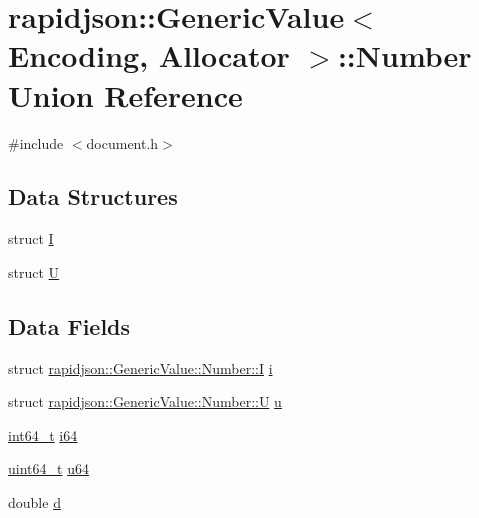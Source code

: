 \hypertarget{unionrapidjson_1_1_generic_value_1_1_number}{}\section{rapidjson\+::Generic\+Value$<$ Encoding, Allocator $>$\+::Number Union Reference}
\label{unionrapidjson_1_1_generic_value_1_1_number}


{\ttfamily \#include $<$document.\+h$>$}

\subsection*{Data Structures}
\begin{DoxyCompactItemize}
\item 
struct \mbox{\hyperlink{structrapidjson_1_1_generic_value_1_1_number_1_1_i}{I}}
\item 
struct \mbox{\hyperlink{structrapidjson_1_1_generic_value_1_1_number_1_1_u}{U}}
\end{DoxyCompactItemize}
\subsection*{Data Fields}
\begin{DoxyCompactItemize}
\item 
struct \mbox{\hyperlink{structrapidjson_1_1_generic_value_1_1_number_1_1_i}{rapidjson\+::\+Generic\+Value\+::\+Number\+::I}} \mbox{\hyperlink{unionrapidjson_1_1_generic_value_1_1_number_abf0b096b8d93d4edbb7d5f5f211b3045}{i}}
\item 
struct \mbox{\hyperlink{structrapidjson_1_1_generic_value_1_1_number_1_1_u}{rapidjson\+::\+Generic\+Value\+::\+Number\+::U}} \mbox{\hyperlink{unionrapidjson_1_1_generic_value_1_1_number_ae5996c0c17bcc7e833ab283b446cc55d}{u}}
\item 
\mbox{\hyperlink{stdint_8h_a414156feea104f8f75b4ed9e3121b2f6}{int64\+\_\+t}} \mbox{\hyperlink{unionrapidjson_1_1_generic_value_1_1_number_a976fe64dee40a548ecc394c56da0d293}{i64}}
\item 
\mbox{\hyperlink{stdint_8h_aec6fcb673ff035718c238c8c9d544c47}{uint64\+\_\+t}} \mbox{\hyperlink{unionrapidjson_1_1_generic_value_1_1_number_a83aa039bfe1f5d2ecd2a6ee76d1f801b}{u64}}
\item 
double \mbox{\hyperlink{unionrapidjson_1_1_generic_value_1_1_number_ad242939291f02654c8ab41ee76769774}{d}}
\end{DoxyCompactItemize}



